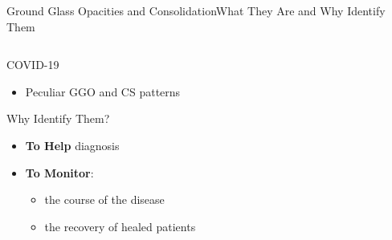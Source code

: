 \documentclass{standalone}
\begin{document}
\begin{frame}{Ground Glass Opacities and Consolidation}{What They Are and Why Identify Them}
\begin{columns}
\begin{column}{0.5\textwidth}
\begin{block}{COVID-19}
\begin{itemize}
						\item Peculiar GGO and CS patterns
						
					\end{itemize}
				\end{block}			
				\begin{block}{Why Identify Them?}
					\begin{itemize}
						
						\item \textbf{To Help} diagnosis
						
						\item \textbf{To Monitor}:  
						\begin{itemize}
							\item the course of the disease
							
							\item the recovery of healed patients
						\end{itemize} 		
					\end{itemize}
				\end{block}				
		\end{column}
	\end{columns}	
	\end{frame}
\end{document}
